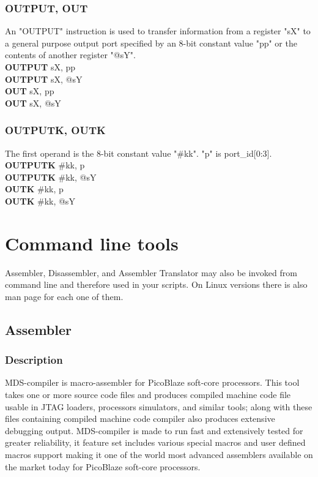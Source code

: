             \subsubsection{OUTPUT, OUT}
                An "OUTPUT" instruction is used to transfer information from a register "sX" to a general purpose output port specified by an 8-bit constant value "pp" or the
                contents of another register "@sY".\\
                \textbf{OUTPUT}     sX, pp\\
                \textbf{OUTPUT}     sX, @sY\\
                \textbf{OUT}        sX, pp\\
                \textbf{OUT}        sX, @sY\\

            \subsubsection{OUTPUTK, OUTK}
                The first operand is the 8-bit constant value "\#kk". "p" is port\_id[0:3].\\
                \textbf{OUTPUTK}     \#kk, p\\
                \textbf{OUTPUTK}     \#kk, @sY\\
                \textbf{OUTK}        \#kk, p\\
                \textbf{OUTK}        \#kk, @sY\\

\section{Command line tools}
    Assembler, Disassembler, and Assembler Translator may also be invoked from command line and therefore used in your scripts. On Linux versions there is also man page for each one of them.

    \subsection{Assembler}
        \subsubsection{Description}
            MDS-compiler is macro-assembler for PicoBlaze soft-core processors. This tool takes one or more source code files and produces compiled machine code file usable in JTAG loaders, processors simulators, and similar tools; along with these files containing compiled machine code compiler also produces extensive debugging output. MDS-compiler is made to run fast and extensively tested for greater reliability, it feature set includes various special macros and user defined macros support making it one of the world most advanced assemblers available on the market today for PicoBlaze soft-core processors.\\

